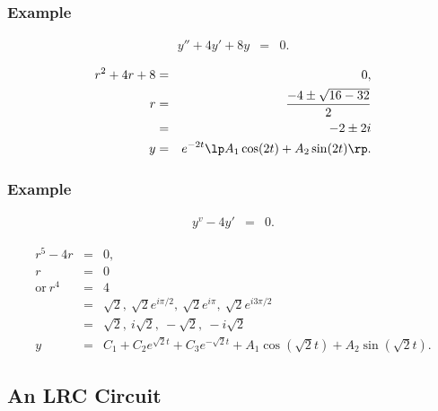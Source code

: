 \begin{frame}
  \frametitle{Example}

  \begin{eqnarray*}
    y'' + 4 y' + 8y & = & 0.
  \end{eqnarray*}

  {
    \begin{eqnarray*}
      r^2 + 4r + 8 & = & 0, \\
      r & = & \frac{-4\pm\sqrt{16-32}}{2} \\
      & = & -2 \pm 2i \\
      y & = & e^{-2t} \lp A_1 \cos(2t) + A_2 \sin(2t) \rp.
    \end{eqnarray*}
  }

\end{frame}


\begin{frame}
  \frametitle{Example}

  \begin{eqnarray*}
    y^v - 4 y'& = & 0.
  \end{eqnarray*}

  {
    \begin{eqnarray*}
      r^5 - 4r & = & 0, \\
      r & = & 0 \\
      \mathrm{or~} r^4 & = & 4 \\
      & = & \sqrt{2},~\sqrt{2}e^{i \pi/2}, ~ \sqrt{2}e^{i \pi},~ \sqrt{2}e^{i 3\pi/2} \\
      & = & \sqrt{2},~i\sqrt{2},~-\sqrt{2},~-i\sqrt{2} \\
      y & = & C_1 + C_2 e^{\sqrt{2}t} + C_3 e^{-\sqrt{2}t} + 
      A_1 \cos(\sqrt{2}t) + A_2 \sin(\sqrt{2}t).
    \end{eqnarray*}
  }


\end{frame}

\subsection{An LRC Circuit}

